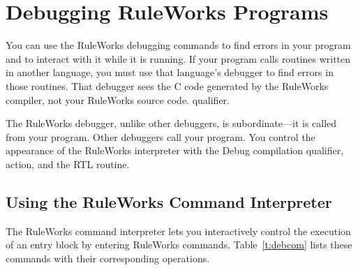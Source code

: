 \chapter{Debugging RuleWorks Programs}
\label{c:debugging}

You can use the RuleWorks debugging commands to find errors in your
program and to interact with it while it is running. If your program
calls routines written in another language, you must use that
language's debugger to find errors in those routines. That debugger
sees the C code generated by the RuleWorks compiler, not your
RuleWorks source code.  qualifier.

\begin{note}
  The RuleWorks debugger, unlike other debuggers, is subordinate---it
  is called from your program. Other debuggers call your program. You
  control the appearance of the RuleWorks interpreter with the Debug
  compilation qualifier,  action, and the 
  RTL routine.
\end{note}

\section{Using the RuleWorks Command Interpreter}

The RuleWorks command interpreter lets you interactively control the
execution of an entry block by entering RuleWorks commands.
Table~\ref{t:debcom} lists these commands with their corresponding
operations.

